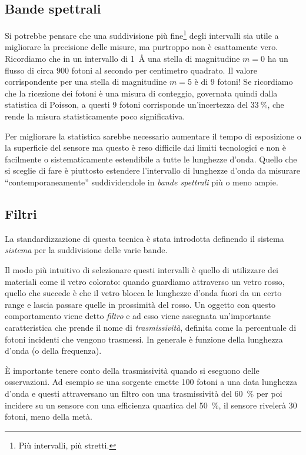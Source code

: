     \subsection{Bande spettrali}
        Si potrebbe pensare che una suddivisione più fine\footnote{Più intervalli, più stretti.} degli intervalli sia utile a migliorare la precisione delle misure, ma purtroppo non è esattamente vero. Ricordiamo che in un intervallo di \SI{1}{\angstrom} una stella di magnitudine $m = \num{0}$ ha un flusso di circa $\num{900}$ fotoni al secondo per centimetro quadrato. Il valore corrispondente per una stella di magnitudine $m = \num{5}$ è di \num{9} fotoni! Se ricordiamo che la ricezione dei fotoni è una misura di conteggio, governata quindi dalla statistica di Poisson, a questi \num{9} fotoni corrisponde un'incertezza del $\SI{33}{\percent}$, che rende la misura statisticamente poco significativa.

        Per migliorare la statistica sarebbe necessario aumentare il tempo di esposizione o la superficie del sensore ma questo è reso difficile dai limiti tecnologici e non è facilmente o sistematicamente estendibile a tutte le lunghezze d'onda. Quello che si sceglie di fare è piuttosto estendere l'intervallo di lunghezze d'onda da misurare ``contemporaneamente'' suddividendole in \emph{bande spettrali} più o meno ampie.
    \subsection{Filtri}
        La standardizzazione di questa tecnica è stata introdotta definendo il sistema \emph{sistema \ubvri} per la suddivisione delle varie bande.
        
        Il modo più intuitivo di selezionare questi intervalli è quello di utilizzare dei materiali come il vetro colorato: quando guardiamo attraverso un vetro rosso, quello che succede è che il vetro blocca le lunghezze d'onda fuori da un certo range e lascia passare quelle in prossimità del rosso. Un oggetto con questo comportamento viene detto \emph{filtro} e ad esso viene assegnata un'importante caratteristica che prende il nome di \emph{trasmissività}, definita come la percentuale di fotoni incidenti che vengono trasmessi. In generale è funzione della lunghezza d'onda (o della frequenza).

        È importante tenere conto della trasmissività quando si eseguono delle osservazioni. Ad esempio se una sorgente emette \num{100} fotoni a una data lunghezza d'onda e questi attraversano un filtro con una trasmissività del \SI{60}{\percent} per poi incidere su un sensore con una efficienza quantica del \SI{50}{\percent}, il sensore rivelerà \num{30} fotoni, meno della metà.

